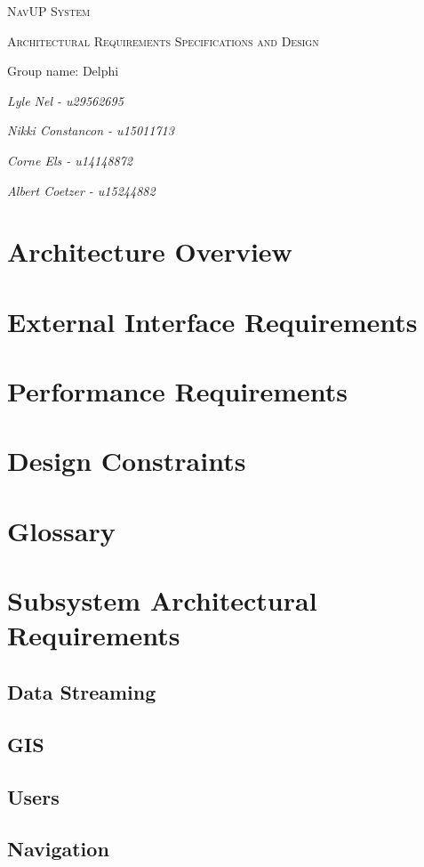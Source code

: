 \documentclass{article}
\begin{document}
\begin{titlepage}
	\centering
	\vfill
	{\scshape\LARGE NavUP System\par}
	\vfill
	{\scshape\Large Architectural Requirements Specifications and Design\par}
	\vfill
	{\Large Group name: Delphi\par}
	\bigskip 
	{\itshape\Large Lyle Nel - u29562695\par}
	{\itshape\Large Nikki Constancon - u15011713\par}
	{\itshape\Large Corne Els - u14148872\par}	
	{\itshape\Large Albert Coetzer - u15244882\par}
	\vfill
\end{titlepage}

\tableofcontents

\clearpage

\section{Architecture Overview}


\section{External Interface Requirements}


\section{Performance Requirements}


\section{Design Constraints}


\section{Glossary}


\section{Subsystem Architectural Requirements}
\clearpage
  \subsection{Data Streaming}
	
\clearpage
  \subsection{GIS}
	
\clearpage
  \subsection{Users}
	
\clearpage
  \subsection{Navigation}
	
\end{document}
